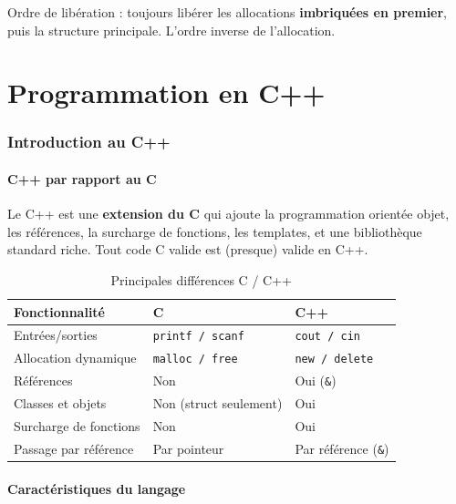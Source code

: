 \documentclass[12pt,a4paper]{article}
\begin{document}
\begin{regle}
Ordre de libération : toujours libérer les allocations \textbf{imbriquées en premier}, puis la structure principale. L'ordre inverse de l'allocation.
\end{regle}


\part{Programmation en C++}

\section{Introduction au C++}

\subsection{C++ par rapport au C}

Le C++ est une \textbf{extension du C} qui ajoute la programmation orientée objet, les références, la surcharge de fonctions, les templates, et une bibliothèque standard riche. Tout code C valide est (presque) valide en C++.

\begin{table}[h!]
\centering
\caption{Principales différences C / C++}
\begin{tabular}{lll}
\toprule
\textbf{Fonctionnalité} & \textbf{C} & \textbf{C++} \\
\midrule
Entrées/sorties & \texttt{printf / scanf} & \texttt{cout / cin} \\
Allocation dynamique & \texttt{malloc / free} & \texttt{new / delete} \\
Références & Non & Oui (\texttt{\&}) \\
Classes et objets & Non (struct seulement) & Oui \\
Surcharge de fonctions & Non & Oui \\
Passage par référence & Par pointeur & Par référence (\texttt{\&}) \\
\bottomrule
\end{tabular}
\end{table}

\subsection{Caractéristiques du langage}
\end{document}
